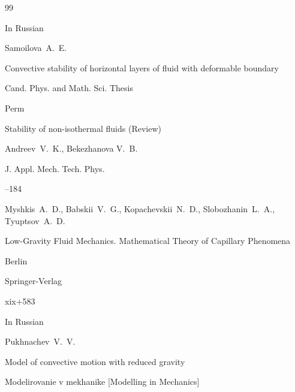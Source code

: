 \begin{thebibliography}{99}







\lang In Russian

\by Samoilova~A.~E.

\thesis Convective stability of horizontal layers of fluid with deformable boundary

\thesisinfo Cand. Phys. and Math. Sci. Thesis

\publaddr Perm








\paper Stability of non-isothermal fluids (Review)

\by Andreev~V.~K., Bekezhanova V.~B.

\jour J. Appl. Mech. Tech. Phys.




--184










\by Myshkis~A.~D., Babskii~V.~G., Kopachevskii~N.~D., Slobozhanin~L.~A., Tyuptsov~A.~D.

\book Low-Gravity Fluid Mechanics. Mathematical Theory of Capillary Phenomena

\publaddr Berlin

\publ Springer-Verlag

\totalpages xix+583 







\lang In Russian

\by Pukhnachev~V.~V.

\paper Model of convective motion with reduced gravity

\jour Modelirovanie v mekhanike \rm [Modelling in Mechanics]


\end{thebibliography}
